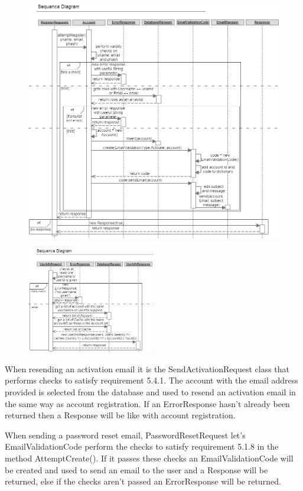 \begin{figure}
    \centering
    \includegraphics[width=\textwidth]{images/sequence/registerUser}
\end{figure}

\begin{figure}
    \includegraphics[width=0.5\textwidth]{images/sequence/userinfo}
\end{figure}

When resending an activation email it is the SendActivationRequest class that performs checks to satisfy requirement 5.4.1. The account with the email address provided is selected from the database and used to resend an activation email in the same way as account registration. If an ErrorResponse hasn't already been returned then a Response will be like with account registration.

When sending a password reset email, PasswordResetRequest let's EmailValidationCode perform the checks to satisfy requirement 5.1.8 in the method AttemptCreate(). If it passes these checks an EmailValidationCode will be created and used to send an email to the user and a Response will be returned, else if the checks aren't passed an ErrorResponse will be returned.

